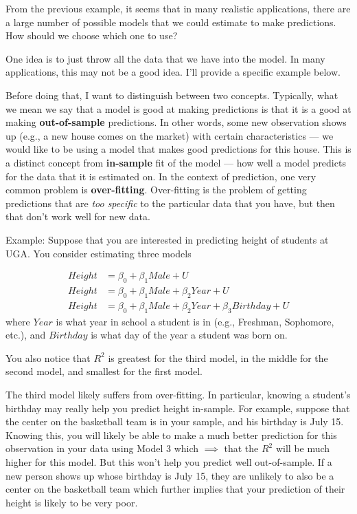 \documentclass[
  letterpaper,
  DIV=11,
  numbers=noendperiod]{scrreprt}
\begin{document}
From the previous example, it seems that in many realistic applications,
there are a large number of possible models that we could estimate to
make predictions. How should we choose which one to use?

One idea is to just throw all the data that we have into the model. In
many applications, this may not be a good idea. I'll provide a specific
example below.

Before doing that, I want to distinguish between two concepts.
Typically, what we mean we say that a model is good at making
predictions is that it is a good at making \textbf{out-of-sample}
predictions. In other words, some new observation shows up (e.g., a new
house comes on the market) with certain characteristics --- we would
like to be using a model that makes good predictions for this house.
This is a distinct concept from \textbf{in-sample} fit of the model ---
how well a model predicts for the data that it is estimated on. In the
context of prediction, one very common problem is \textbf{over-fitting}.
Over-fitting is the problem of getting predictions that are \emph{too
specific} to the particular data that you have, but then that don't work
well for new data.

{Example: }Suppose that you are interested in predicting height of
students at UGA. You consider estimating three models

\[
  \begin{aligned}
    Height &= \beta_0 + \beta_1 Male + U \\
    Height &= \beta_0 + \beta_1 Male + \beta_2 Year + U \\
    Height &= \beta_0 + \beta_1 Male + \beta_2 Year + \beta_3 Birthday + U
  \end{aligned}
\] where \(Year\) is what year in school a student is in (e.g.,
Freshman, Sophomore, etc.), and \(Birthday\) is what day of the year a
student was born on.

You also notice that \(R^2\) is greatest for the third model, in the
middle for the second model, and smallest for the first model.

The third model likely suffers from over-fitting. In particular, knowing
a student's birthday may really help you predict height in-sample. For
example, suppose that the center on the basketball team is in your
sample, and his birthday is July 15. Knowing this, you will likely be
able to make a much better prediction for this observation in your data
using Model 3 which \(\implies\) that the \(R^2\) will be much higher
for this model. But this won't help you predict well out-of-sample. If a
new person shows up whose birthday is July 15, they are unlikely to also
be a center on the basketball team which further implies that your
prediction of their height is likely to be very poor.
\end{document}
